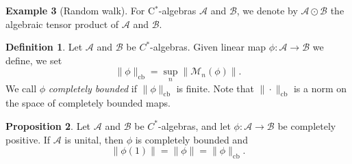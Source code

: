 \documentclass[10pt,a4paper]{amsart}
\theoremstyle{definition}
\newtheorem{definition}{Definition}[section]
\theoremstyle{definition}
\newtheorem{example}[definition]{Example}
\theoremstyle{definition}
\theoremstyle{definition}
\newtheorem{proposition}[definition]{Proposition}
\theoremstyle{definition}
\theoremstyle{definition}
\newtheorem{theorem}[definition]{Theorem}
\begin{document}
\begin{example}[Random walk]
For C$^*$-algebras $\mathcal{A}$ and $\mathcal{B}$, we denote by $\mathcal{A}\odot \mathcal{B} $ the algebraic tensor product of $\mathcal{A}$ and $\mathcal{B}$.

  


\begin{definition}
Let $\mathcal{A}$ and $\mathcal{B}$ be $C^*$-algebras. Given  linear map $\phi: \mathcal{A} \to \mathcal{B}$ we define, we set
\[
\|\phi\|_{\text{cb}} = \sup_n \|\mathcal{M}_n(\phi)\|.
\]
We call $\phi$ \emph{completely bounded} if $\|\phi\|_{\text{cb}} $ is finite.
Note that $\|\cdot\|_{\text{cb}}$ is a norm on the space of completely bounded maps. 

\end{definition}


\begin{proposition} \label{prop:cp_cb} \cite[Exercise 11.5 (iii)]{pisierIntroductionOperatorSpace2003}
  Let $\mathcal{A}$ and $\mathcal{B}$ be $C^*$-algebras, and let $\phi: \mathcal{A} \to \mathcal{B}$ be completely positive. If $\mathcal{A}$ is unital, then $\phi$ is completely bounded and 
\[
\|\phi(1)\| = \|\phi\| = \|\phi\|_{\text{cb}}.
\]
\end{proposition}

\begin{comment}
\begin{theorem} \label{thm:tensor_cb} \cite[Proposition 12.3]{paulsenCompletelyBoundedMaps2003}
  Let $\mathcal{A}_i$ and $\mathcal{B}_i$ be unital $C^*$-algebras, let $\mathcal{S}_i \subseteq \mathcal{A}_i$ be subspaces, 
and let $L_i: \mathcal{S}_i \to \mathcal{B}_i$ be completely bounded, $i = 1,2$. Then the linear map $L_1 \widecheck{\otimes}_\varepsilon 
L_2: \mathcal{S}_1 \widecheck{\otimes}_\varepsilon \mathcal{S}_2 \to \mathcal{B}_1 \widecheck{\otimes}_\varepsilon \mathcal{B}_2$, given by $(L_1 \widecheck{\otimes}_\varepsilon L_2)(a_1 \otimes a_2) = L_1(a_1) \otimes L_2(a_2)$, 
defines a completely bounded map $L_1 \widecheck{\otimes}_\varepsilon L_2: \mathcal{S}_1 \widecheck{\otimes}_\varepsilon \mathcal{S}_2 \to \mathcal{B}_1 \widecheck{\otimes}_\varepsilon \mathcal{B}_2$, with
\[
\|L_1 \widecheck{\otimes}_\varepsilon L_2\|_{\text{cb}} = \|L_1\|_{\text{cb}} \|L_2\|_{\text{cb}}.
\]
\end{theorem}



\end{comment}
\end{example}
\end{document}
